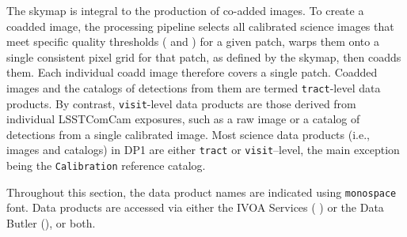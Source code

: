 The skymap is integral to the production of co-added images.
To create a coadded image, the processing \gls{pipeline} selects all calibrated science images that meet specific quality thresholds ( and ) for a given \gls{patch}, warps them onto a single consistent pixel grid for that \gls{patch}, as defined by the skymap, then coadds them.
Each individual coadd image therefore covers a single \gls{patch}.
Coadded images and the catalogs of detections from them are termed \texttt{tract}-level data products.
By contrast, \texttt{visit}-level data products are those derived from individual \gls{LSSTComCam} exposures, such as a raw image or a catalog of detections from a single calibrated image.
Most science data products (i.e., images and catalogs) in \gls{DP1} are either \texttt{tract} or \texttt{visit}--level, the main exception being the \texttt{Calibration} reference catalog.

Throughout this section, the data product names are indicated using \texttt{monospace} font.
Data products are accessed via either the \gls{IVOA} Services ( ) or the Data \gls{Butler} (), or both.





